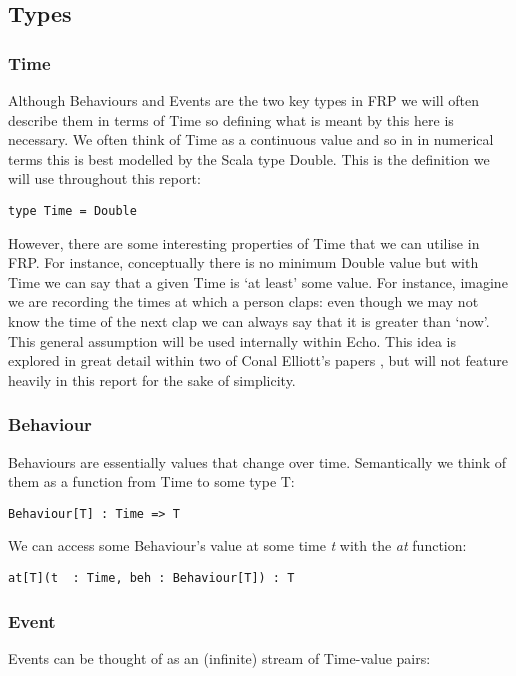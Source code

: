     \subsection{Types}
      \subsubsection{Time}
        Although Behaviours and Events are the two key types in FRP we will often describe them
        in terms of Time so defining what is meant by this here is necessary. We often think of
        Time as a continuous value and so in in numerical terms this is best modelled by the
        Scala type Double. This is the definition we will use throughout this report:

\begin{verbatim}
type Time = Double
\end{verbatim}    

        However, there are some interesting properties of Time that we can utilise in FRP. For instance,
        conceptually there is no minimum Double value but with Time we can say that a given Time is `at least'
        some value. For instance, imagine we are recording the times at which a person claps: even though we
        may not know the time of the next clap we can always say that it is greater than `now'. This
        general assumption will be used internally within Echo. This idea is explored in great detail
        within two of Conal Elliott's papers \cite{Elliott1997}, \cite{Elliott2009} but will not feature
        heavily in this report for the sake of simplicity.
   
      \subsubsection{Behaviour}
        Behaviours are essentially values that change over time. Semantically we think of them as
        a function from Time to some type T:

\begin{verbatim}
Behaviour[T] : Time => T
\end{verbatim}
        
        We can access some Behaviour's value at some time \emph{t} with the \emph{at} function:

\begin{verbatim}
at[T](t  : Time, beh : Behaviour[T]) : T
\end{verbatim}
      
      \subsubsection{Event}
        Events can be thought of as an (infinite) stream of Time-value pairs:

